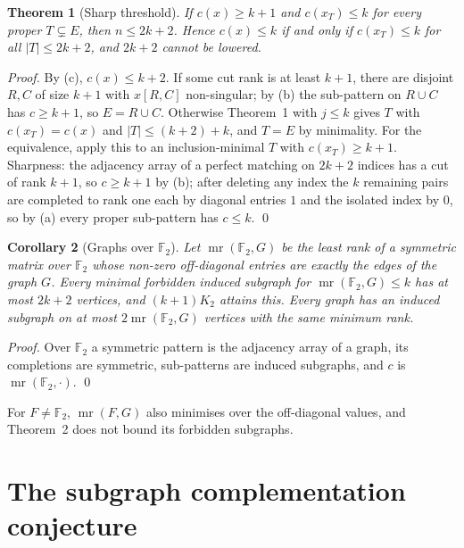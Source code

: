 \documentclass[11pt,letterpaper,reqno]{amsart}
\theoremstyle{spaced}
\newtheorem{theorem}{Theorem}
\newtheorem{corollary}[theorem]{Corollary}
\begin{document}
\begin{theorem}[Sharp threshold]
If \(c(x) \ge k+1\) and \(c(x_T) \le k\) for every proper \(T \subsetneq E\), then \(n \le 2k+2\). Hence \(c(x) \le k\) if and only if \(c(x_T) \le k\) for all \(\lvert T\rvert \le 2k+2\), and \(2k+2\) cannot be lowered.
\end{theorem}

\emph{Proof.} By (c), \(c(x) \le k+2\). If some cut rank is at least \(k+1\), there are disjoint \(R, C\) of size \(k+1\) with \(x[R, C]\) non-singular; by (b) the sub-pattern on \(R \cup C\) has \(c \ge k+1\), so \(E = R \cup C\). Otherwise Theorem~1 with \(j \le k\) gives \(T\) with \(c(x_T) = c(x)\) and \(\lvert T\rvert \le (k+2) + k\), and \(T = E\) by minimality. For the equivalence, apply this to an inclusion-minimal \(T\) with \(c(x_T) \ge k+1\). Sharpness: the adjacency array of a perfect matching on \(2k+2\) indices has a cut of rank \(k+1\), so \(c \ge k+1\) by (b); after deleting any index the \(k\) remaining pairs are completed to rank one each by diagonal entries \(1\) and the isolated index by \(0\), so by (a) every proper sub-pattern has \(c \le k\). \qed

\begin{corollary}[Graphs over $\mathbb{F}_2$]
Let \(\operatorname{mr}(\mathbb{F}_2, G)\) be the least rank of a symmetric matrix over \(\mathbb{F}_2\) whose non-zero off-diagonal entries are exactly the edges of the graph \(G\). Every minimal forbidden induced subgraph for \(\operatorname{mr}(\mathbb{F}_2, G) \le k\) has at most \(2k+2\) vertices, and \((k+1)K_2\) attains this. Every graph has an induced subgraph on at most \(2\operatorname{mr}(\mathbb{F}_2, G)\) vertices with the same minimum rank.
\end{corollary}

\emph{Proof.} Over \(\mathbb{F}_2\) a symmetric pattern is the adjacency array of a graph, its completions are symmetric, sub-patterns are induced subgraphs, and \(c\) is \(\operatorname{mr}(\mathbb{F}_2, \cdot)\). \qed

For \(F \ne \mathbb{F}_2\), \(\operatorname{mr}(F, G)\) also minimises over the off-diagonal values, and Theorem~2 does not bound its forbidden subgraphs.

\newpage\hypertarget{the-subgraph-complementation-conjecture}{%
\section{The subgraph complementation conjecture}\label{the-subgraph-complementation-conjecture}}
\end{document}
